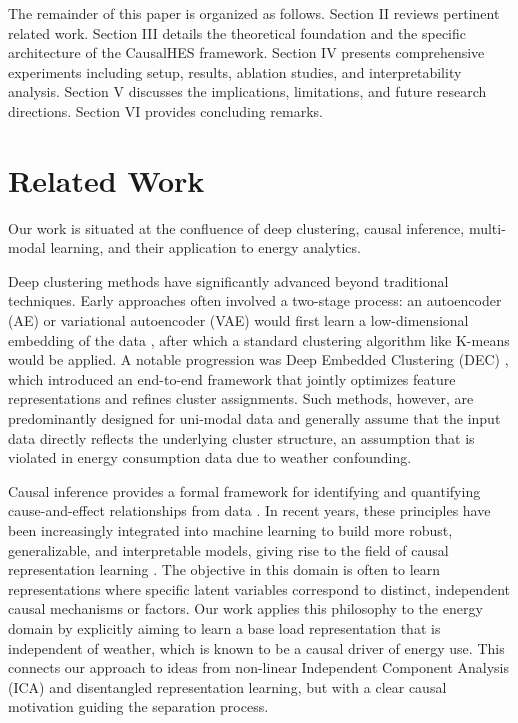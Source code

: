 \documentclass[journal]{IEEEtran}
\begin{document}
The remainder of this paper is organized as follows. Section II reviews pertinent related work. Section III details the theoretical foundation and the specific architecture of the CausalHES framework. Section IV presents comprehensive experiments including setup, results, ablation studies, and interpretability analysis. Section V discusses the implications, limitations, and future research directions. Section VI provides concluding remarks.


\section{Related Work}
Our work is situated at the confluence of deep clustering, causal inference, multi-modal learning, and their application to energy analytics.

Deep clustering methods have significantly advanced beyond traditional techniques. Early approaches often involved a two-stage process: an autoencoder (AE) or variational autoencoder (VAE) would first learn a low-dimensional embedding of the data \cite{autoencoder_representation_learning}, after which a standard clustering algorithm like K-means would be applied. A notable progression was Deep Embedded Clustering (DEC) \cite{deep_embedding_clustering_xie}, which introduced an end-to-end framework that jointly optimizes feature representations and refines cluster assignments. Such methods, however, are predominantly designed for uni-modal data and generally assume that the input data directly reflects the underlying cluster structure, an assumption that is violated in energy consumption data due to weather confounding.

Causal inference provides a formal framework for identifying and quantifying cause-and-effect relationships from data \cite{pearl2009causality}. In recent years, these principles have been increasingly integrated into machine learning to build more robust, generalizable, and interpretable models, giving rise to the field of causal representation learning \cite{causal_representation_learning, scholkopf2021toward}. The objective in this domain is often to learn representations where specific latent variables correspond to distinct, independent causal mechanisms or factors. Our work applies this philosophy to the energy domain by explicitly aiming to learn a base load representation that is independent of weather, which is known to be a causal driver of energy use. This connects our approach to ideas from non-linear Independent Component Analysis (ICA) \cite{hyvarinen2000independent} and disentangled representation learning, but with a clear causal motivation guiding the separation process.
\end{document}
